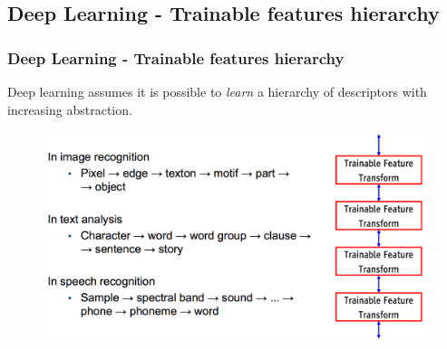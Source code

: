 \documentclass[professionalfont]{beamer}
\begin{document}
  \subsection{Deep Learning - Trainable features hierarchy}
  \begin{frame}
    \frametitle{Deep Learning - Trainable features hierarchy}
    Deep learning assumes it is possible to \textit{learn} a hierarchy
    of descriptors with increasing abstraction.
    \begin{figure}
      \includegraphics[scale=0.4]{deep3.png}
      \label{}
    \end{figure}
  \end{frame}
\end{document}
